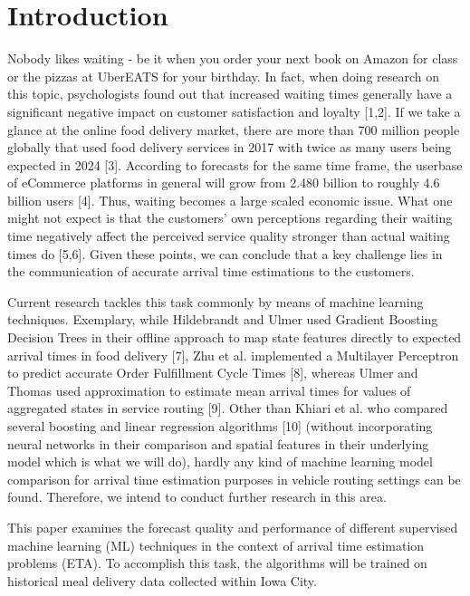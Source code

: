 \chapter{Introduction}

Nobody likes waiting - be it when you order your next book on Amazon for class or the pizzas at UberEATS for your birthday. In fact, when doing research on this topic, psychologists found out that increased waiting times generally have a significant negative impact on customer satisfaction and loyalty [1,2]. If we take a glance at the online food delivery market, there are more than 700 million people globally that used food delivery services in 2017 with twice as many users being expected in 2024 [3]. According to forecasts for the same time frame, the userbase of eCommerce platforms in general will grow from 2.480 billion to roughly 4.6 billion users [4]. Thus, waiting becomes a large scaled economic issue. What one might not expect is that the customers’ own perceptions regarding their waiting time negatively affect the perceived service quality stronger than actual waiting times do [5,6]. Given these points, we can conclude that a key challenge lies in the communication of accurate arrival time estimations to the customers. 

Current research tackles this task commonly by means of machine learning techniques. Exemplary, while Hildebrandt and Ulmer used Gradient Boosting Decision Trees in their offline approach to map state features directly to expected arrival times in food delivery [7], Zhu et al. implemented a Multilayer Perceptron to predict accurate Order Fulfillment Cycle Times [8], whereas Ulmer and Thomas used approximation to estimate mean arrival times for values of aggregated states in service routing [9]. Other than Khiari et al. who compared several boosting and linear regression algorithms [10] (without incorporating neural networks in their comparison and spatial features in their underlying model which is what we will do), hardly any kind of machine learning model comparison for arrival time estimation purposes in vehicle routing settings can be found. Therefore, we intend to conduct further research in this area.  

This paper examines the forecast quality and performance of different supervised machine learning (ML) techniques in the context of arrival time estimation problems (ETA). To accomplish this task, the algorithms will be trained on historical meal delivery data collected within Iowa City. 

